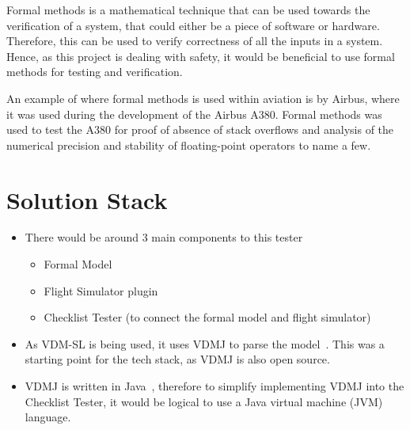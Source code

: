 \documentclass[../dissertation.tex]{subfiles}
\begin{document}
Formal methods is a mathematical technique that can be used towards the verification
of a system, that could either be a piece of software or hardware.
Therefore, this can be used to verify correctness of all the inputs in a system.~\cite{nasa:formal}
Hence, as this project is dealing with safety, it would be beneficial to use
formal methods for testing and verification.

An example of where formal methods is used within aviation is by Airbus, where
it was used during the development of the Airbus A380. Formal methods was used to test
the A380 for proof of absence of stack overflows and analysis of the numerical precision
and stability of floating-point operators to name a few.~\cite{airbus:formal}



\section{Solution Stack}
\begin{itemize}
  \item There would be around 3 main components to this tester
    \begin{itemize}
      \item Formal Model
      \item Flight Simulator plugin
      \item Checklist Tester (to connect the formal model and flight simulator)
    \end{itemize}
  \item As VDM-SL is being used, it uses VDMJ to parse the model~\cite{vdmj}. This was a starting
    point for the tech stack, as VDMJ is also open source.
  \item VDMJ is written in Java~\cite{vdmj}, therefore to simplify implementing VDMJ into the
    Checklist Tester, it would be logical to use a Java virtual machine (JVM) language.
\end{itemize}
\end{document}
